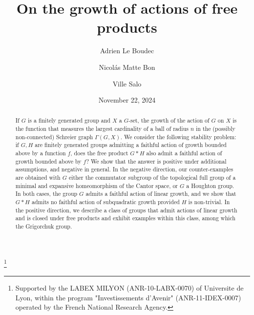 \documentclass[11pt]{amsart}
\newcommand{\red}[1]{{\color{red}#1}}
\theoremstyle{definition}
\theoremstyle{plain}
\theoremstyle{remark}
\begin{document}
  \date{November 22, 2024}	
	
\title{On the growth of actions of free products}


\author{Adrien Le Boudec}
\address{CNRS, UMPA - ENS Lyon, 46 all\'ee d'Italie, 69364 Lyon, France}

\author{Nicol\'as Matte Bon}
\address{
	CNRS,
	Institut Camille Jordan (ICJ, UMR CNRS 5208),
	Universit\'e Claude Bernard Lyon 1,
	43 blvd.\ du 11 novembre 1918,	69622 Villeurbanne,	France}


\author{Ville Salo}
\address{University of Turku, Department of Mathematics and Statistics, Finland.}


\thanks{Supported by the LABEX MILYON (ANR-10-LABX-0070) of Universite de Lyon, within the program "Investissements d'Avenir" (ANR-11-IDEX-0007) operated by the French National Research Agency.}

\maketitle

%
%

\begin{abstract}
	If $G$ is a finitely generated group and $X$ a $G$-set, the growth of the action of $G$ on $X$ is the function that measures the largest cardinality of a ball of radius $n$ in the (possibly non-connected) Schreier graph $\Gamma(G,X)$. We consider the following stability problem: if $G,H$ are finitely generated groups admitting a faithful action of growth bounded above by a function $f$, does the free product $G \ast H$ also admit a faithful action of growth bounded above by $f$? We show that the answer is positive under additional assumptions, and negative in general. In the negative direction, our counter-examples are obtained with $G$ either the commutator subgroup of the topological full group of a minimal and expansive homeomorphism of the Cantor space, or $G$ a Houghton group. In both cases, the group $G$ admits a faithful action of linear growth, and we show that $G\ast H$  admits no faithful action of subquadratic growth provided $H$ is non-trivial. {In the positive direction, we describe a class of groups that admit actions of linear growth and is closed under free products and exhibit examples within this class, among which the Grigorchuk group.} \end{abstract}
\end{document}
